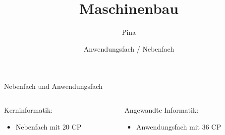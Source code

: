 \documentclass[11pt]{beamer}
\title[Anwendungsfach / Nebenfach: Maschinenbau] %
{Maschinenbau}
\author {Pina \faHandPeaceO}
\date[WiSe2021] %
{Anwendungsfach / Nebenfach}
\begin{document}


\begin{frame}
	\titlepage
\end{frame}












\begin{frame}{Nebenfach und Anwendungsfach}


\begin{columns}[T] %
\begin{column}{.48\textwidth}
\color{red}

Kerninformatik: \\
\begin{itemize}
\item Nebenfach mit 20 CP
\end{itemize}


\end{column}%
\hfill%
\begin{column}{.48\textwidth}
\color{blue}


Angewandte Informatik: \\
\begin{itemize}
\item Anwendungsfach mit 36 CP
\end{itemize}


\end{column}%
\end{columns}
\end{frame}




\end{document}
